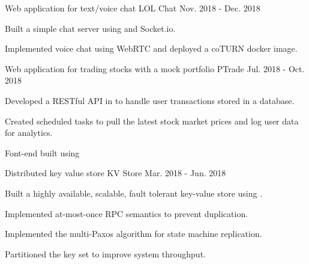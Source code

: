 

\begin{cventries}

  \cventry
    {Web application for text/voice chat} %
    {LOL Chat} %
    {} %
    {Nov. 2018 - Dec. 2018} %
    {
      \begin{cvitems} %
        \item {Built a simple chat server using  and Socket.io.}
        \item {Implemented voice chat using WebRTC and deployed a coTURN docker image.}
      \end{cvitems}
    }

  \cventry
    {Web application for trading stocks with a mock portfolio} %
    {PTrade} %
    {} %
    {Jul. 2018 - Oct. 2018} %
    {
      \begin{cvitems} %
        \item {Developed a RESTful API in  to handle user transactions stored in a  database.}
        \item {Created scheduled tasks to pull the latest stock market prices and log user data for analytics.}
        \item {Font-end built using }
      \end{cvitems}
    }

  \cventry
    {Distributed key value store} %
    {KV Store} %
    {} %
    {Mar. 2018 - Jun. 2018} %
    {
      \begin{cvitems} %
        \item{Built a highly available, scalable, fault tolerant key-value store using .}
        \item{Implemented at-most-once RPC semantics to prevent duplication.}
        \item{Implemented the multi-Paxos algorithm for state machine replication.}
        \item{Partitioned the key set to improve system throughput.}
      \end{cvitems}
    }


\end{cventries}
